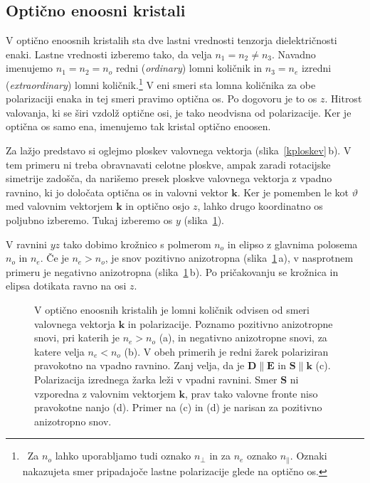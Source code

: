 \subsection*{Optično enoosni kristali}
V optično enoosnih kristalih sta dve lastni vrednosti tenzorja dielektričnosti 
enaki. Lastne vrednosti izberemo
tako, da velja $n_{1}=n_{2}\neq n_{3}$. Navadno imenujemo 
$n_{1}=n_{2}=n_{o}$ redni (\textit{ordinary})
lomni količnik in $n_{3}=n_{e}$ izredni 
(\textit{extraordinary}) lomni 
količnik.\footnote{~Za $n_o$ lahko uporabljamo tudi 
oznako $n_{\perp}$ in za $n_e$ oznako $n_{\parallel}$. Oznaki
nakazujeta smer pripadajoče lastne polarizacije glede na optično os.}
V eni smeri sta lomna količnika za obe polarizaciji enaka in tej smeri pravimo 
optična os. Po dogovoru je to os $z$. Hitrost valovanja, ki
se širi vzdolž optične osi, je tako neodvisna od polarizacije.
Ker je optična os samo ena, imenujemo tak kristal optično enoosen. 
\newpage

Za lažjo predstavo si oglejmo ploskev valovnega vektorja (slika~\ref{kploskev}\,b). 
V tem primeru ni treba obravnavati celotne ploskve, ampak zaradi rotacijske simetrije
zadošča, da narišemo presek ploskve valovnega vektorja z vpadno ravnino, ki jo določata 
optična os in valovni vektor $\mathbf{k}$. Ker je pomemben le kot $\vartheta$ med 
valovnim vektorjem $\mathbf{k}$ in optično osjo $z$, lahko drugo 
koordinatno os poljubno izberemo. Tukaj izberemo
os $y$ (slika~\ref{fig:Elipsa}). 

V ravnini $yz$ tako dobimo krožnico s polmerom $n_o$ in elipso z glavnima polosema
$n_o$ in $n_e$. Če je $n_e>n_o$, je snov pozitivno anizotropna (slika~\ref{fig:Elipsa}\,a), 
v nasprotnem primeru je negativno anizotropna (slika~\ref{fig:Elipsa}\,b). Po 
pričakovanju se krožnica in elipsa dotikata ravno na osi $z$. 

\begin{figure}[ht]
\centering
\def\svgwidth{120truemm} 

\caption{V optično enoosnih kristalih je lomni količnik odvisen
od smeri valovnega vektorja $\mathbf{k}$ in polarizacije. 
Poznamo pozitivno anizotropne snovi, pri katerih
je $n_e>n_o$ (a), in negativno anizotropne snovi, 
za katere velja $n_e< n_o$ (b). V obeh primerih je redni 
žarek polariziran pravokotno na vpadno ravnino. Zanj velja, 
da je $\mathbf{D} \parallel \mathbf{E}$ in $\mathbf{S} \parallel \mathbf{k}$ (c). 
Polarizacija izrednega žarka leži v vpadni ravnini. 
Smer $\mathbf{S}$ ni vzporedna z valovnim vektorjem
$\mathbf{k}$, prav tako valovne fronte niso pravokotne nanjo (d). 
Primer na (c) in (d) je narisan za pozitivno 
anizotropno snov.}
\label{fig:Elipsa}
\end{figure}

